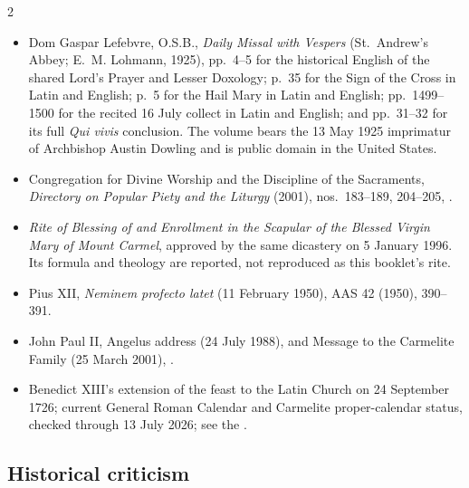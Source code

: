 \begin{multicols}{2}
\begin{itemize}
\item Dom Gaspar Lefebvre, O.S.B., \textit{Daily Missal with Vespers} (St.~Andrew's Abbey; E.~M. Lohmann, 1925), pp.~4--5 for the historical English of the shared Lord's Prayer and Lesser Doxology; p.~35 for the Sign of the Cross in Latin and English; p.~5 for the Hail Mary in Latin and English; pp.~1499--1500 for the recited 16 July collect in Latin and English; and pp.~31--32 for its full \textit{Qui vivis} conclusion. The volume bears the 13 May 1925 imprimatur of Archbishop Austin Dowling and is public domain in the United States.
\item Congregation for Divine Worship and the Discipline of the Sacraments, \textit{Directory on Popular Piety and the Liturgy} (2001), nos.~183--189, 204--205, .
\item \textit{Rite of Blessing of and Enrollment in the Scapular of the Blessed Virgin Mary of Mount Carmel}, approved by the same dicastery on 5 January 1996. Its formula and theology are reported, not reproduced as this booklet's rite.
\item Pius XII, \textit{Neminem profecto latet} (11 February 1950), AAS 42 (1950), 390--391.
\item John Paul II, Angelus address (24 July 1988), and Message to the Carmelite Family (25 March 2001), .
\item Benedict XIII's extension of the feast to the Latin Church on 24 September 1726; current General Roman Calendar and Carmelite proper-calendar status, checked through 13 July 2026; see the .
\end{itemize}

\subsection{Historical criticism}


\end{multicols}
